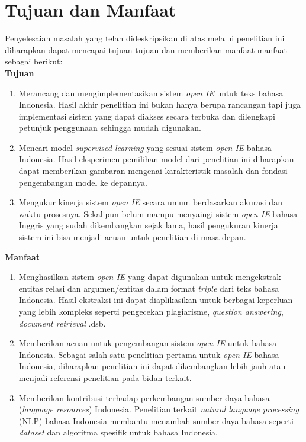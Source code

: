 \section{Tujuan dan Manfaat}

Penyelesaian masalah yang telah dideskripsikan di atas melalui penelitian ini diharapkan dapat mencapai tujuan-tujuan dan memberikan manfaat-manfaat sebagai berikut:\\

\textbf{Tujuan}

\begin{enumerate}
	\item Merancang dan mengimplementasikan sistem \textit{open IE} untuk teks bahasa Indonesia. Hasil akhir penelitian ini bukan hanya berupa rancangan tapi juga implementasi sistem yang dapat diakses secara terbuka dan dilengkapi petunjuk penggunaan sehingga mudah digunakan.
	
	\item Mencari model \textit{supervised learning} yang sesuai sistem \textit{open IE} bahasa Indonesia. Hasil eksperimen pemilihan model dari penelitian ini diharapkan dapat memberikan gambaran mengenai karakteristik masalah dan fondasi pengembangan model ke depannya.
	
	\item Mengukur kinerja sistem \textit{open IE} secara umum berdasarkan akurasi dan waktu prosesnya. Sekalipun belum mampu menyaingi sistem \textit{open IE} bahasa Inggris yang sudah dikembangkan sejak lama, hasil pengukuran kinerja sistem ini bisa menjadi acuan untuk penelitian di masa depan.
\end{enumerate}

\textbf{Manfaat}

\begin{enumerate}
	\item Menghasilkan sistem \textit{open IE} yang dapat digunakan untuk mengekstrak entitas relasi dan argumen/entitas dalam format \textit{triple} dari teks bahasa Indonesia. Hasil ekstraksi ini dapat diaplikasikan untuk berbagai keperluan yang lebih kompleks seperti pengecekan plagiarisme, \textit{question answering}, \textit{document retrieval} .dsb.
	
	\item Memberikan acuan untuk pengembangan sistem \textit{open IE} untuk bahasa Indonesia. Sebagai salah satu penelitian pertama untuk \textit{open IE} bahasa Indonesia, diharapkan penelitian ini dapat dikembangkan lebih jauh atau menjadi referensi penelitian pada bidan terkait.
	
	\item Memberikan kontribusi terhadap perkembangan sumber daya bahasa (\textit{language resources}) Indonesia. Penelitian terkait \textit{natural language processing} (NLP) bahasa Indonesia membantu menambah sumber daya bahasa seperti \textit{dataset} dan algoritma spesifik untuk bahasa Indonesia.
\end{enumerate}

